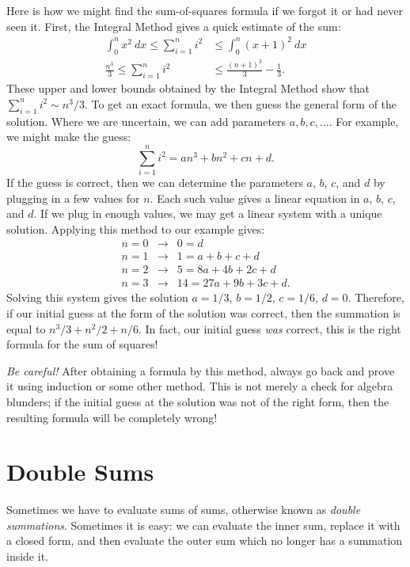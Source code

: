 Here is how we might find the sum-of-squares formula if we forgot it
or had never seen it.  First, the Integral Method gives a quick
estimate of the sum:
\begin{align*}
\int_0^n x^2 \ dx 
\leq \sum_{i=1}^n i^2 
&\leq \int_0^n (x+1)^2 \ dx 
\\
\frac{n^3}{3} 
\leq \sum_{i=1}^n i^2 
&\leq \frac{(n+1)^3}{3} - \frac{1}{3}. 
\end{align*}
These upper and lower bounds obtained by the Integral Method show that
$\sum_{i=1}^n i^2 \sim n^3/3$.  To get an exact formula, we
then guess the general form of the solution.  Where we are uncertain,
we can add parameters $a, b, c, \dots$.  For example, we might make
the guess:
\[
\sum_{i=1}^n i^2 = an^3 + bn^2 + cn + d.
\]
If the guess is correct, then we can determine the parameters $a$,
$b$, $c$, and $d$ by plugging in a few values for $n$.  Each such
value gives a linear equation in $a$, $b$, $c$, and $d$.  If we plug
in enough values, we may get a linear system with a unique solution.
Applying this method to our example gives:
\begin{eqnarray*}
n = 0 & \rightarrow & 0 = d \\
n = 1 & \rightarrow & 1 = a + b + c + d \\
n = 2 & \rightarrow & 5 = 8a + 4b + 2c + d \\
n = 3 & \rightarrow & 14 = 27a + 9b + 3c + d.
\end{eqnarray*}
Solving this system gives the solution $a = 1/3$, $b = 1/2$, $c = 1/6$, $d
= 0$.  Therefore, if our initial guess at the form of the solution was
correct, then the summation is equal to $n^3/3 + n^2/2 + n/6$.  In fact,
our initial guess {\em was} correct, this is the right formula for the sum
of squares!

{\em Be careful!}  After obtaining a formula by this method, always go
back and prove it using induction or some other method.  This is not
merely a check for algebra blunders; if the initial guess at the
solution was not of the right form, then the resulting formula will be
completely wrong!

\section{Double Sums}

Sometimes we have to evaluate sums of sums, otherwise known as
\emph{double summations}.  Sometimes it is easy: we can evaluate the
inner sum, replace it with a closed form, and then evaluate the outer
sum which no longer has a summation inside it.

